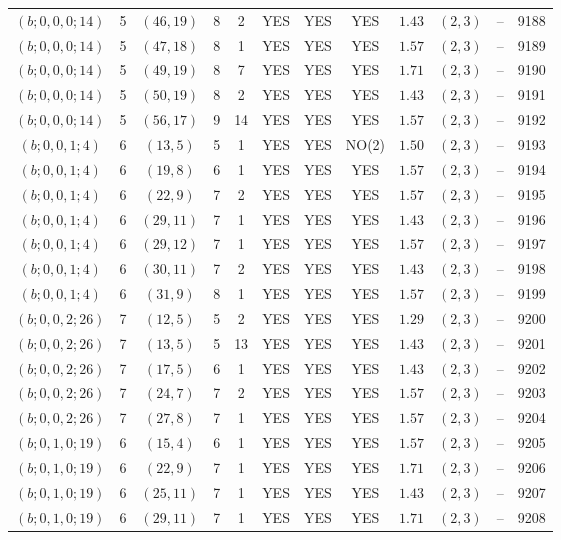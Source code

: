 \begin{longtable}{|c|c|c|c|c|c|c|c|c|c|c|c|}
$(b;0,0,0;14)$ & 5 & $(46,19)$ & 8 & 2 & YES & YES & YES & $1.43$ & $(2,3)$ & -- & 9188\\
$(b;0,0,0;14)$ & 5 & $(47,18)$ & 8 & 1 & YES & YES & YES & $1.57$ & $(2,3)$ & -- & 9189\\
$(b;0,0,0;14)$ & 5 & $(49,19)$ & 8 & 7 & YES & YES & YES & $1.71$ & $(2,3)$ & -- & 9190\\
$(b;0,0,0;14)$ & 5 & $(50,19)$ & 8 & 2 & YES & YES & YES & $1.43$ & $(2,3)$ & -- & 9191\\
$(b;0,0,0;14)$ & 5 & $(56,17)$ & 9 & 14 & YES & YES & YES & $1.57$ & $(2,3)$ & -- & 9192\\
$(b;0,0,1;4)$ & 6 & $(13,5)$ & 5 & 1 & YES & YES & NO(2) & $1.50$ & $(2,3)$ & -- & 9193\\
$(b;0,0,1;4)$ & 6 & $(19,8)$ & 6 & 1 & YES & YES & YES & $1.57$ & $(2,3)$ & -- & 9194\\
$(b;0,0,1;4)$ & 6 & $(22,9)$ & 7 & 2 & YES & YES & YES & $1.57$ & $(2,3)$ & -- & 9195\\
$(b;0,0,1;4)$ & 6 & $(29,11)$ & 7 & 1 & YES & YES & YES & $1.43$ & $(2,3)$ & -- & 9196\\
$(b;0,0,1;4)$ & 6 & $(29,12)$ & 7 & 1 & YES & YES & YES & $1.57$ & $(2,3)$ & -- & 9197\\
$(b;0,0,1;4)$ & 6 & $(30,11)$ & 7 & 2 & YES & YES & YES & $1.43$ & $(2,3)$ & -- & 9198\\
$(b;0,0,1;4)$ & 6 & $(31,9)$ & 8 & 1 & YES & YES & YES & $1.57$ & $(2,3)$ & -- & 9199\\
$(b;0,0,2;26)$ & 7 & $(12,5)$ & 5 & 2 & YES & YES & YES & $1.29$ & $(2,3)$ & -- & 9200\\
$(b;0,0,2;26)$ & 7 & $(13,5)$ & 5 & 13 & YES & YES & YES & $1.43$ & $(2,3)$ & -- & 9201\\
$(b;0,0,2;26)$ & 7 & $(17,5)$ & 6 & 1 & YES & YES & YES & $1.43$ & $(2,3)$ & -- & 9202\\
$(b;0,0,2;26)$ & 7 & $(24,7)$ & 7 & 2 & YES & YES & YES & $1.57$ & $(2,3)$ & -- & 9203\\
$(b;0,0,2;26)$ & 7 & $(27,8)$ & 7 & 1 & YES & YES & YES & $1.57$ & $(2,3)$ & -- & 9204\\
$(b;0,1,0;19)$ & 6 & $(15,4)$ & 6 & 1 & YES & YES & YES & $1.57$ & $(2,3)$ & -- & 9205\\
$(b;0,1,0;19)$ & 6 & $(22,9)$ & 7 & 1 & YES & YES & YES & $1.71$ & $(2,3)$ & -- & 9206\\
$(b;0,1,0;19)$ & 6 & $(25,11)$ & 7 & 1 & YES & YES & YES & $1.43$ & $(2,3)$ & -- & 9207\\
$(b;0,1,0;19)$ & 6 & $(29,11)$ & 7 & 1 & YES & YES & YES & $1.71$ & $(2,3)$ & -- & 9208\\

\end{longtable}
